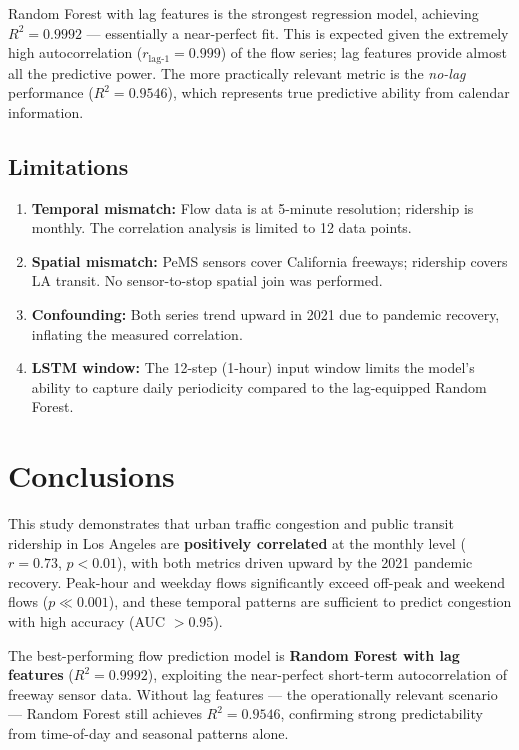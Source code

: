 \documentclass[12pt,a4paper]{article}
\begin{document}
Random Forest with lag features is the strongest regression model, achieving $R^2 = 0.9992$ — essentially a near-perfect fit. This is expected given the extremely high autocorrelation ($r_{\text{lag-1}} = 0.999$) of the flow series; lag features provide almost all the predictive power. The more practically relevant metric is the \emph{no-lag} performance ($R^2 = 0.9546$), which represents true predictive ability from calendar information.

\subsection{Limitations}

\begin{enumerate}
    \item \textbf{Temporal mismatch:} Flow data is at 5-minute resolution; ridership is monthly. The correlation analysis is limited to 12 data points.
    \item \textbf{Spatial mismatch:} PeMS sensors cover California freeways; ridership covers LA transit. No sensor-to-stop spatial join was performed.
    \item \textbf{Confounding:} Both series trend upward in 2021 due to pandemic recovery, inflating the measured correlation.
    \item \textbf{LSTM window:} The 12-step (1-hour) input window limits the model's ability to capture daily periodicity compared to the lag-equipped Random Forest.
\end{enumerate}

\section{Conclusions}

This study demonstrates that urban traffic congestion and public transit ridership in Los Angeles are \textbf{positively correlated} at the monthly level ($r = 0.73$, $p < 0.01$), with both metrics driven upward by the 2021 pandemic recovery. Peak-hour and weekday flows significantly exceed off-peak and weekend flows ($p \ll 0.001$), and these temporal patterns are sufficient to predict congestion with high accuracy (AUC $> 0.95$).

The best-performing flow prediction model is \textbf{Random Forest with lag features} ($R^2 = 0.9992$), exploiting the near-perfect short-term autocorrelation of freeway sensor data. Without lag features — the operationally relevant scenario — Random Forest still achieves $R^2 = 0.9546$, confirming strong predictability from time-of-day and seasonal patterns alone.
\end{document}
